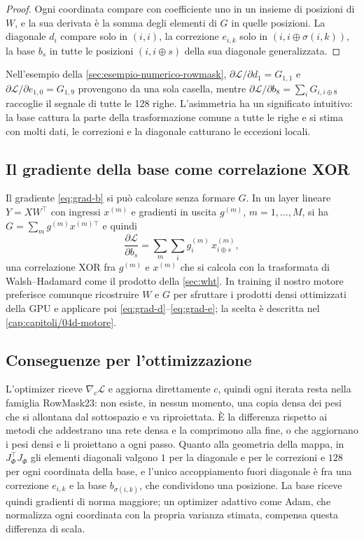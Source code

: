 \begin{proof}
Ogni coordinata compare con coefficiente uno in un insieme di posizioni di $W$, e la sua derivata è la somma degli elementi di $G$ in quelle posizioni. La diagonale $d_i$ compare solo in $(i,i)$, la correzione $e_{i,k}$ solo in $(i,i\oplus\sigma(i,k))$, la base $b_s$ in tutte le posizioni $(i,i\oplus s)$ della sua diagonale generalizzata.
\end{proof}

Nell'esempio della \autoref{sec:esempio-numerico-rowmask}, $\partial\mathcal{L}/\partial d_1=G_{1,1}$ e $\partial\mathcal{L}/\partial e_{1,0}=G_{1,9}$ provengono da una sola casella, mentre $\partial\mathcal{L}/\partial b_8=\sum_i G_{i,i\oplus8}$ raccoglie il segnale di tutte le 128 righe. L'asimmetria ha un significato intuitivo: la base cattura la parte della trasformazione comune a tutte le righe e si stima con molti dati, le correzioni e la diagonale catturano le eccezioni locali.

\subsection{Il gradiente della base come correlazione XOR}
 Il gradiente \eqref{eq:grad-b} si può calcolare senza formare $G$. In un layer lineare $Y=XW^\top$ con ingressi $x^{(m)}$ e gradienti in uscita $g^{(m)}$, $m=1,\dots,M$, si ha $G=\sum_m g^{(m)}x^{(m)\top}$ e quindi
\[
\frac{\partial\mathcal{L}}{\partial b_s} = \sum_m \sum_i g^{(m)}_i\, x^{(m)}_{i\oplus s},
\]
una correlazione XOR fra $g^{(m)}$ e $x^{(m)}$ che si calcola con la trasformata di Walsh--Hadamard come il prodotto della \autoref{sec:wht}. In training il nostro motore preferisce comunque ricostruire $W$ e $G$ per sfruttare i prodotti densi ottimizzati della GPU e applicare poi \eqref{eq:grad-d}--\eqref{eq:grad-e}; la scelta è descritta nel \autoref{cap:capitoli/04d-motore}.

\subsection{Conseguenze per l'ottimizzazione}
 L'optimizer riceve $\nabla_c\mathcal{L}$ e aggiorna direttamente $c$, quindi ogni iterata resta nella famiglia RowMask23: non esiste, in nessun momento, una copia densa dei pesi che si allontana dal sottospazio e va riproiettata. È la differenza rispetto ai metodi che addestrano una rete densa e la comprimono alla fine, o che aggiornano i pesi densi e li proiettano a ogni passo. Quanto alla geometria della mappa, in $J_\Phi^\top J_\Phi$ gli elementi diagonali valgono $1$ per la diagonale e per le correzioni e $128$ per ogni coordinata della base, e l'unico accoppiamento fuori diagonale è fra una correzione $e_{i,k}$ e la base $b_{\sigma(i,k)}$, che condividono una posizione. La base riceve quindi gradienti di norma maggiore; un optimizer adattivo come Adam, che normalizza ogni coordinata con la propria varianza stimata, compensa questa differenza di scala.


